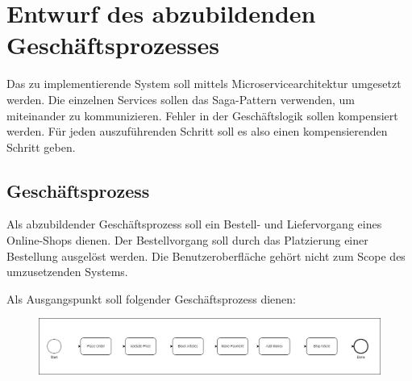 \section{Entwurf des abzubildenden Geschäftsprozesses}

Das zu implementierende System soll mittels Microservicearchitektur umgesetzt werden. Die einzelnen Services sollen das Saga-Pattern verwenden, um miteinander zu kommunizieren. Fehler in der Geschäftslogik sollen kompensiert werden. Für jeden auszuführenden Schritt soll es also einen kompensierenden Schritt geben. 

\subsection{Geschäftsprozess}

Als abzubildender Geschäftsprozess soll ein Bestell- und Liefervorgang eines Online-Shops dienen. Der Bestellvorgang soll durch das Platzierung einer Bestellung ausgelöst werden. Die Benutzeroberfläche gehört nicht zum Scope des umzusetzenden Systems. 

Als Ausgangspunkt soll folgender Geschäftsprozess dienen:

\begin{figure}[h!]
	\includegraphics[width=\linewidth]{figures/SimplifiedBusinessProcess.png}
\end{figure}



